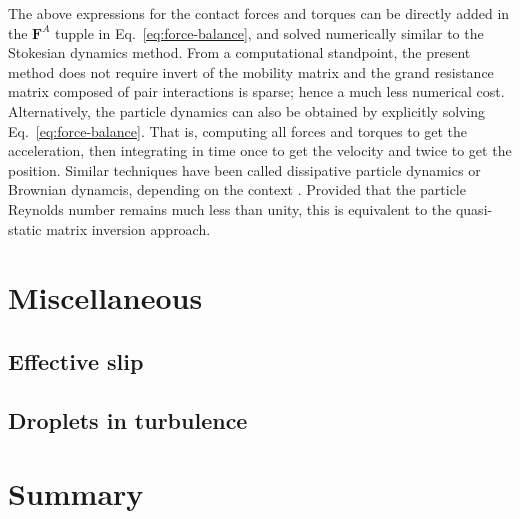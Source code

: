 The above expressions for the contact forces and torques can be directly added in the ${\bm F}^A$ tupple in Eq.\ \eqref{eq:force-balance}, and solved numerically similar to the Stokesian dynamics method.
From a computational standpoint, the present method does not require invert of the mobility matrix and the grand resistance matrix composed of pair interactions is sparse; hence a much less numerical cost.
Alternatively, the particle dynamics can also be obtained by explicitly solving Eq.\ \eqref{eq:force-balance}. That is, computing all forces and torques to get the acceleration, then integrating in time once to get the velocity and twice to get the position.
Similar techniques have been called dissipative particle dynamics or Brownian dynamcis, depending on the context \citep{Hoogerbrugge_1992, Groot_Warren_1997}.
Provided that the particle Reynolds number remains much less than unity, this is equivalent to the quasi-static matrix inversion approach.



\chapter{Miscellaneous}

\section{Effective slip}

\section{Droplets in turbulence}


\chapter{Summary}






